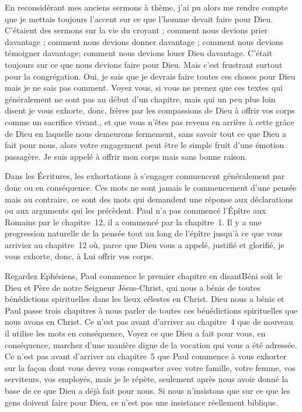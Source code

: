 En reconsidérant mes anciens sermons à thème, j'ai pu alors me rendre compte que je mettais toujours l’accent sur
ce que l’homme devait faire pour Dieu. C’étaient des sermons sur la vie du croyant ; comment nous devions prier
davantage ; comment nous devions donner davantage ; comment nous devions témoigner davantage; comment nous
devions louer Dieu davantage. C’était toujours sur ce que nous devions faire pour Dieu. Mais c’est frustrant surtout
pour la congrégation. Oui, je sais que je devrais faire toutes ces choses pour Dieu mais je ne sais pas comment.
Voyez vous, si vous ne prenez que ces textes qui généralement ne sont pas au début d’un chapitre, mais qui un peu
plus loin disent \og je vous exhorte, donc, frères par les compassions de Dieu à offrir vos corps comme un sacrifice
vivant.\fg{}, et que vous n’êtes pas revenu en arrière à cette grâce de Dieu en laquelle nous demeurons fermement, sans
savoir tout ce que Dieu a fait pour nous, alors votre engagement peut être le simple fruit d’une émotion passagère. Je
suis appelé à offrir mon corps mais sans bonne raison.

Dans les Écritures, les exhortations à s’engager commencent généralement par \og donc\fg{} ou \og en conséquence\fg{}. Ces
mots ne sont jamais le commencement d’une pensée mais au contraire, ce sont des mots qui demandent une réponse
aux déclarations ou aux arguments qui les précèdent.
Paul n’a pas commencé l’Épître aux Romains par le chapitre~12, il a commencé par la chapitre~1. Il y a une
progression naturelle de la pensée tout au long de l’épître jusqu’à ce que vous arriviez au chapitre~12 où, parce que
Dieu vous a appelé, justifié et glorifié, je vous exhorte, donc, à Lui offrir vos corps.

Regardez Ephésiens, Paul commence le premier chapitre en disant\frcolon\og Béni soit le Dieu et Père de notre Seigneur
Jésus-Christ, qui nous a bénis de toutes bénédictions spirituelles dans les lieux célestes en Christ.\fg{} Dieu nous a bénis
et Paul passe trois chapitres à nous parler de toutes ces bénédictions spirituelles que nous avons en Christ. Ce n’est
pas avant d’arriver au chapitre~4 que de nouveau il utilise les mots \og en conséquence\fg{}, \og Voyez ce que Dieu a fait pour
vous, en conséquence, marchez d’une manière digne de la vocation qui vous a été adressée.\fg{} Ce n’est pas avant
d’arriver au chapitre~5 que Paul commence à vous exhorter sur la façon dont vous devez vous comporter avec votre
famille, votre femme, vos serviteurs, vos employés, mais je le répète, seulement après nous avoir donné la base de ce
que Dieu a déjà fait pour nous. Si nous n’insistons que sur ce que les gens doivent faire pour Dieu, ce n’est pas une
insistance réellement biblique.

